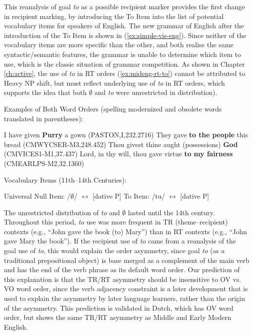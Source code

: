 	This reanalysis of goal \textit{to} as a possible recipient marker provides the first change in recipient marking, by introducing the To Item into the list of potential vocabulary items for speakers of English. The new grammar of English after the introduction of the To Item is shown in (\ref{ex:simple-vis-eng}). Since neither of the vocabulary items are more specific than the other, and both realise the same syntactic/semantic features, the grammar is unable to determine which item to use, which is the classic situation of grammar competition. As shown in Chapter \ref{ch:active}, the use of \textit{to} in RT orders (\ref{ex:mideng-rt-to}) cannot be attributed to Heavy NP shift, but must reflect underlying use of \textit{to} in RT orders, which supports the idea that both $\emptyset$ and \textit{to} were unrestricted in distribution). 

	\begin{exe}
		\ex Examples of Both Word Orders (spelling modernized and obsolete words translated in parentheses):
		\begin{xlist}
			\ex I have given \textbf{Purry} a gown (PASTON,I,232.2716)
			\ex They gave \textbf{to the people} this bread (CMWYCSER-M3,248.452)\label{ex:mideng-rt-to}
			\ex Thou givest thine aught (possessions) \textbf{God} (CMVICES1-M1,37.437)
			\ex Lord, in thy will, thou gave virtue \textbf{to my fairness} (CMEARLPS-M2,32.1360)
		\end{xlist}
		\ex Vocabulary Items (11th--14th Centuries):\label{ex:simple-vis-eng}
		\begin{xlist}
			\ex Universal Null Item: /$\emptyset$/ $\leftrightarrow$ [dative P]
			\ex To Item: /tu/ $\leftrightarrow$ [dative P]
		\end{xlist}
	\end{exe}

	The unrestricted distribution of \textit{to} and $\emptyset$ lasted until the 14th century. Throughout this period, \textit{to} use was more frequent in TR (theme--recipient) contexts (e.g., ``John gave the book (to) Mary'') than in RT contexts (e.g., ``John gave Mary the book''). If the recipient use of \textit{to} came from a reanalysis of the goal use of \textit{to}, this would explain the order asymmetry, since goal \textit{to} (as a traditional prepositional object) is base merged as a complement of the main verb and has the end of the verb phrase as its default word order. Our prediction of this explanation is that the TR/RT asymmetry should be insensitive to OV vs. VO word order, since the verb adjacency constraint is a later development that is used to explain the asymmetry by later language learners, rather than the origin of the asymmetry. This prediction is validated in Dutch, which has OV word order, but shows the same TR/RT asymmetry as Middle and Early Modern English.
	
